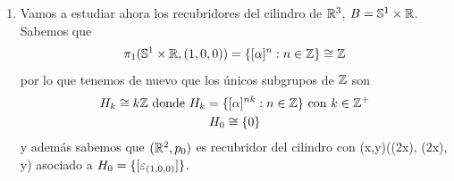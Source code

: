 \begin{ejemplo}
\begin{enumerate}
        Ahora nos planteamos de nuevo que $\bb{S}^1$ es recubridor de sí mismo pero que hay más formas de recubrirse, es decir, podemos encontrar funciones recubridoras $p_k$ con $k\in \bb{Z}^+$ de forma que todas recubran a la circunferencia pero ``enrollandola más'', es decir, llevando cada vuelta de $R=\bb{S}^1$ en $k$ vueltas de $B=\bb{S}^1$. Definimos así la aplicación $p_k$ para $k\geq 2$ (el caso $k=1$ es la identidad que ya se ha estudiado) dada por 
             {(\cos(\theta), \sen(\theta))}{(\cos(k\theta), \sen(k\theta))}
        Además tendríamos que 
             {[\alpha]}{[\alpha]^k}
        Llegando a que 
        \begin{gather*}
            p_{k*}(\pi_1(\bb{S}^1, (1,0))) = H_k = \{[\alpha]^{kn} : n\in \bb{Z}\}
        \end{gather*}
        Por tanto, los únicos recubridores de $\bb{S}^1$ son
        \begin{gather*}
            (\bb{R}, p)\text{ con } p(t)=(\cos(2\pi t), \sen(2\pi t))\\
            (\bb{S}^1, p_k)\text{ con } p_k(\cos(\theta), \sen(\theta)) = (\cos(k\theta), \sen(k\theta)) \text{ para todo } k\in \bb{Z}^+
        \end{gather*}

        \item Vamos a estudiar ahora los recubridores del cilindro de $\mathbb{R}^3$, $B=\mathbb{S}^1\times \mathbb{R}$. Sabemos que
        \begin{gather*}
            \pi_1(\mathbb{S}^1\times \mathbb{R}, (1,0,0)) = \{[\alpha]^n : n\in \mathbb{Z}\} \cong \mathbb{Z}
        \end{gather*}
        por lo que tenemos de nuevo que los únicos subgrupos de $\mathbb{Z}$ son 
        \begin{gather*}
            H_k \cong k\mathbb{Z} \text{ donde } H_k = \{[\alpha]^{nk} : n\in \mathbb{Z}\} \text{ con } k\in \mathbb{Z}^+\\
            H_0 \cong \{0\}
        \end{gather*}
        y además sabemos que $(\mathbb{R}^2, p_0)$ es recubridor del cilindro con
             {(x,y)}{(\cos(2\pi x), \sen(2\pi x), y)}
        asociado a $H_0=\{[\varepsilon_{(1,0,0)}]\}$.\\


\end{enumerate}
\end{ejemplo}
